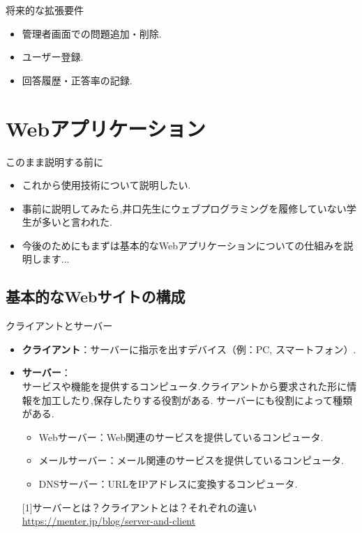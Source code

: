 \documentclass[aspectratio=169]{beamer}
\begin{document}
\begin{frame}{将来的な拡張要件}
    \begin{itemize}
        \setlength{\parskip}{1.5em}
        \item 管理者画面での問題追加・削除.
        \item ユーザー登録.
        \item 回答履歴・正答率の記録.
    \end{itemize}
\end{frame}

\section{Webアプリケーション}

\begin{frame}{このまま説明する前に}
    \begin{itemize}
        \setlength{\parskip}{1.5em}
        \item これから使用技術について説明したい.
        \item 事前に説明してみたら,井口先生にウェブプログラミングを履修していない学生が多いと言われた.
        \item 今後のためにもまずは基本的なWebアプリケーションについての仕組みを説明します...
    \end{itemize}
\end{frame}

\subsection{基本的なWebサイトの構成}
\begin{frame}{クライアントとサーバー}
    \begin{itemize}
        \setlength{\parskip}{1.5em}
        \item \textbf{クライアント}：サーバーに指示を出すデバイス（例：PC, スマートフォン）\cite{server-client}.
        \item \textbf{サーバー}：\\サービスや機能を提供するコンピュータ.クライアントから要求された形に情報を加工したり,保存したりする役割がある.
                                サーバーにも役割によって種類がある.\\
        \vspace{1em}                                
        \begin{itemize}
            \setlength{\parskip}{1em}
            \item Webサーバー：Web関連のサービスを提供しているコンピュータ.
            \item メールサーバー：メール関連のサービスを提供しているコンピュータ.
            \item DNSサーバー：URLをIPアドレスに変換するコンピュータ.
        \end{itemize}                                
      {\tiny [1]サーバーとは？クライアントとは？それぞれの違い\url{https://menter.jp/blog/server-and-client}}  
        
    \end{itemize}
\end{frame}
\end{document}
